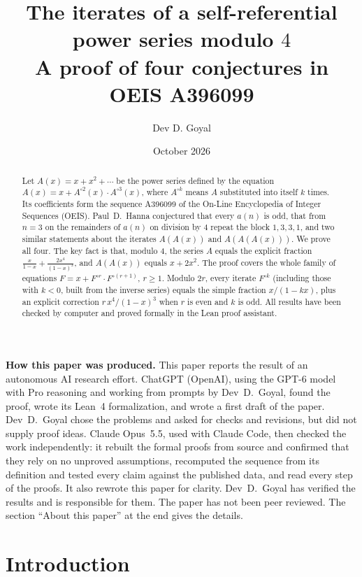 \documentclass[11pt,a4paper]{article}
\title{The iterates of a self-referential power series modulo $4$\\[6pt]\large A proof of four conjectures in OEIS A396099}
\author{Dev D. Goyal}
\date{October 2026}
\theoremstyle{definition}
\theoremstyle{remark}
\begin{document}
\maketitle
\begin{abstract}
Let $A(x)=x+x^2+\cdots$ be the power series defined by the equation
$A(x)=x+A^{\circ2}(x)\cdot A^{\circ3}(x)$, where $A^{\circ k}$ means $A$ substituted into
itself $k$ times. Its coefficients form the sequence A396099 of the On-Line Encyclopedia of Integer Sequences
(OEIS). Paul~D.~Hanna conjectured that every $a(n)$ is odd, that from $n=3$ on the remainders of $a(n)$ on division by $4$ repeat
the block $1,3,3,1$, and two similar statements about the iterates $A(A(x))$ and $A(A(A(x)))$. We prove all four. The key fact is that, modulo $4$, the series $A$ equals the explicit fraction
$\frac{x}{1-x}+\frac{2x^4}{(1-x)^3}$, and $A(A(x))$ equals $x+2x^2$. The proof covers the whole family of
equations $F=x+F^{\circ r}\cdot F^{\circ(r+1)}$, $r\ge1$. Modulo $2r$, every iterate $F^{\circ k}$ (including those
with $k<0$, built from the inverse series) equals the simple fraction $x/(1-kx)$, plus an explicit correction
$r\,x^4/(1-x)^3$ when $r$ is even and $k$ is odd. All results have been checked by computer and proved formally in the
Lean proof assistant.
\end{abstract}
\begin{center}\begin{minipage}{0.88\linewidth}\small
\textbf{How this paper was produced.} This paper reports the result of an autonomous AI research effort.
ChatGPT (OpenAI), using the GPT-6 model with Pro reasoning and working from prompts by Dev~D.~Goyal, found the proof, wrote its Lean~4 formalization, and wrote a first draft of the paper.
Dev~D.~Goyal chose the problems and asked for checks and revisions, but did not supply proof ideas.
Claude Opus~5.5, used with Claude Code, then checked the work independently: it rebuilt the formal proofs from
source and confirmed that they rely on no unproved assumptions, recomputed the sequence from its definition and tested
every claim against the published data, and read every step of the proofs. It also rewrote this paper for clarity.
Dev~D.~Goyal has verified the results and is responsible for them. The paper has not been peer reviewed.
The section ``About this paper'' at the end gives the details.
\end{minipage}\end{center}

\section{Introduction}
\end{document}
